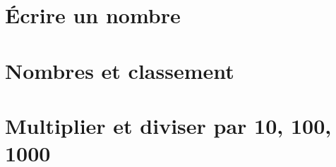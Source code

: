 \documentclass[12pt,a4paper]{article}
\date{}
\title{}
\begin{document}




\section{\'Ecrire un nombre}\label{sec:ecrire-un-nombre}



\section{Nombres et classement}



\section{Multiplier et diviser par 10, 100, 1000}


\end{document}
